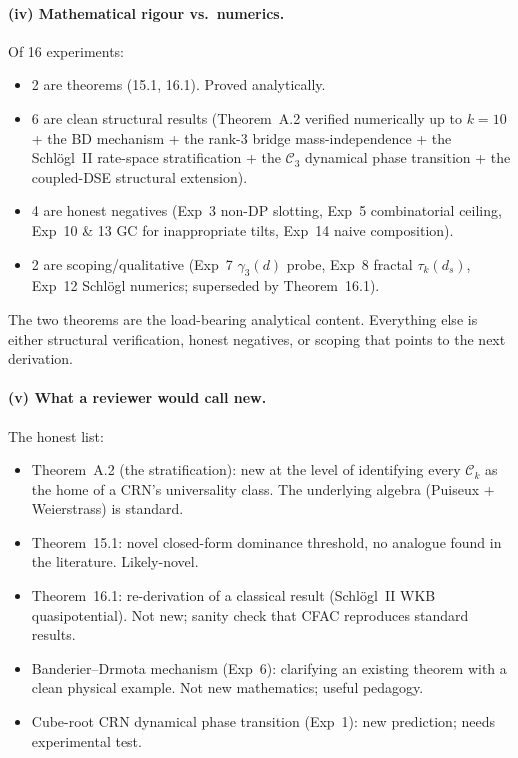 \documentclass[11pt,a4paper]{article}
\theoremstyle{plain}
\begin{document}
\paragraph{(iv) Mathematical rigour vs.\ numerics.}
Of 16 experiments:
\begin{itemize}[leftmargin=1.2em]
\item 2 are theorems (15.1, 16.1).  Proved analytically.
\item 6 are clean structural results (Theorem~A.2 verified numerically up
  to $k=10$ + the BD mechanism + the rank-3 bridge mass-independence +
  the Schl\"ogl~II rate-space stratification + the $\mathcal{C}_{3}$
  dynamical phase transition + the coupled-DSE structural extension).
\item 4 are honest negatives (Exp~3 non-DP slotting, Exp~5
  combinatorial ceiling, Exp~10 \& 13 GC for inappropriate tilts,
  Exp~14 naive composition).
\item 2 are scoping/qualitative (Exp~7 $\gamma_{3}(d)$ probe, Exp~8
  fractal $\tau_{k}(d_{s})$, Exp~12 Schl\"ogl numerics; superseded by
  Theorem~16.1).
\end{itemize}
The two theorems are the load-bearing analytical content.  Everything
else is either structural verification, honest negatives, or scoping
that points to the next derivation.

\paragraph{(v) What a reviewer would call new.}
The honest list:
\begin{itemize}[leftmargin=1.2em]
\item Theorem~A.2 (the stratification): new at the level of identifying
  every $\mathcal{C}_{k}$ as the home of a CRN's universality class.  The
  underlying algebra (Puiseux + Weierstrass) is standard.
\item Theorem~15.1: novel closed-form dominance threshold, no analogue
  found in the literature.  Likely-novel.
\item Theorem~16.1: re-derivation of a classical result (Schl\"ogl~II
  WKB quasipotential).  Not new; sanity check that CFAC reproduces
  standard results.
\item Banderier--Drmota mechanism (Exp~6): clarifying an existing
  theorem with a clean physical example.  Not new mathematics; useful
  pedagogy.
\item Cube-root CRN dynamical phase transition (Exp~1): new prediction;
  needs experimental test.
\end{itemize}
\end{document}
